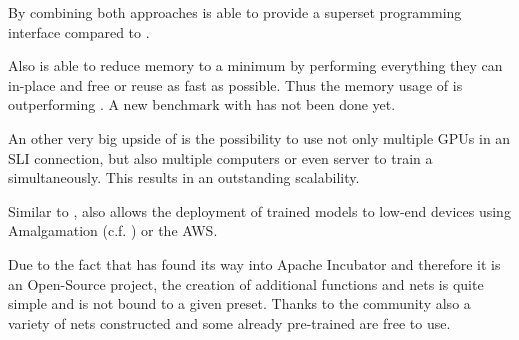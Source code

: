 By combining both approaches \mxnet is able to provide a superset programming interface compared to \caffe. \cite{chen2015mxnet}

Also \mxnet is able to reduce memory to a minimum by performing everything they can in-place and free or reuse as fast as possible. Thus the memory usage of \mxnet is outperforming \caffe. \cite{chen2015mxnet} %
A new benchmark with \caffetwo has not been done yet.

An other very big upside of \mxnet is the possibility to use not only multiple GPUs in an SLI connection, but also multiple computers or even server to train a \nn simultaneously. This results in an outstanding scalability. \cite{chen2015mxnet}

Similar to \caffetwo, \mxnet also allows the deployment of trained models to low-end devices using Amalgamation (c.f. \cite{MxNetHomepage}) or the AWS.

Due to the fact that \mxnet has found its way into Apache Incubator and therefore it is an Open-Source project, the creation of additional functions and nets is quite simple and is not bound to a given preset. Thanks to the community also a variety of nets constructed and some already pre-trained are free to use. \cite{MxNetGithubModelGallery}
